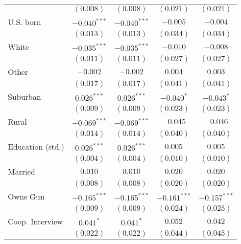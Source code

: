 \begin{table}
\begin{center}
\begin{tabular}{l c c c c}
                                 & $(0.008)$      & $(0.008)$      & $(0.021)$      & $(0.021)$      \\
U.S. born                        & $-0.040^{***}$ & $-0.040^{***}$ & $-0.005$       & $-0.004$       \\
                                 & $(0.013)$      & $(0.013)$      & $(0.034)$      & $(0.034)$      \\
White                            & $-0.035^{***}$ & $-0.035^{***}$ & $-0.010$       & $-0.008$       \\
                                 & $(0.011)$      & $(0.011)$      & $(0.027)$      & $(0.027)$      \\
Other                            & $-0.002$       & $-0.002$       & $0.004$        & $0.003$        \\
                                 & $(0.017)$      & $(0.017)$      & $(0.041)$      & $(0.041)$      \\
Suburban                         & $0.026^{***}$  & $0.026^{***}$  & $-0.040^{*}$   & $-0.043^{*}$   \\
                                 & $(0.009)$      & $(0.009)$      & $(0.023)$      & $(0.023)$      \\
Rural                            & $-0.069^{***}$ & $-0.069^{***}$ & $-0.045$       & $-0.046$       \\
                                 & $(0.014)$      & $(0.014)$      & $(0.040)$      & $(0.040)$      \\
Education (std.)                 & $0.026^{***}$  & $0.026^{***}$  & $0.005$        & $0.005$        \\
                                 & $(0.004)$      & $(0.004)$      & $(0.010)$      & $(0.010)$      \\
Married                          & $0.010$        & $0.010$        & $0.020$        & $0.020$        \\
                                 & $(0.008)$      & $(0.008)$      & $(0.020)$      & $(0.020)$      \\
Owns Gun                         & $-0.165^{***}$ & $-0.165^{***}$ & $-0.161^{***}$ & $-0.157^{***}$ \\
                                 & $(0.009)$      & $(0.009)$      & $(0.024)$      & $(0.025)$      \\
Coop. Interview                  & $0.041^{*}$    & $0.041^{*}$    & $0.052$        & $0.042$        \\
                                 & $(0.022)$      & $(0.022)$      & $(0.044)$      & $(0.045)$      \\

\end{tabular}
\end{center}
\end{table}
